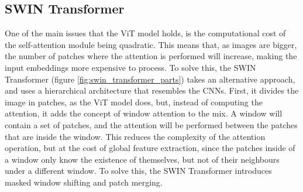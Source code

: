 \subsection{SWIN Transformer}
\label{sec:swin-transformer}
One of the main issues that the ViT model holds, is the computational cost of the self-attention module being quadratic. This means that, as images are bigger, the number of patches where the attention is performed will increase, making the input embeddings more expensive to process. To solve this, the SWIN Transformer \cite{liu2021swin} (figure \ref{fig:swin_transformer_parts}) takes an alternative approach, and uses a hierarchical architecture that resembles the CNNs. First, it divides the image in patches, as the ViT model does, but, instead of computing the attention, it adds the concept of window attention to the mix. A window will contain a set of patches, and the attention will be performed between the patches that are inside the window. This reduces the complexity of the attention operation, but at the cost of global feature extraction, since the patches inside of a window only know the existence of themselves, but not of their neighbours under a different window. To solve this, the SWIN Transformer introduces masked window shifting and patch merging. 


